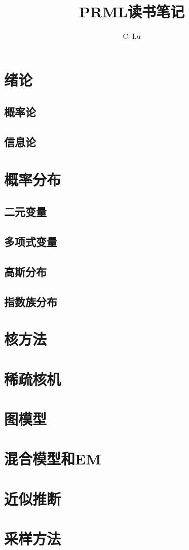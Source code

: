 \documentclass[11pt]{ctexbook}
\title{\textbf{PRML读书笔记} }
\author{C. Lu}
\begin{document}
\maketitle
\tableofcontents

\chapter{绪论}
\section{概率论}
\section{信息论}

\chapter{概率分布}
\section{二元变量}
\section{多项式变量}
\section{高斯分布}
\section{指数族分布}


\chapter{核方法}

\chapter{稀疏核机}

\chapter{图模型}

\chapter{混合模型和EM}

\chapter{近似推断}

\chapter{采样方法}
\end{document}

